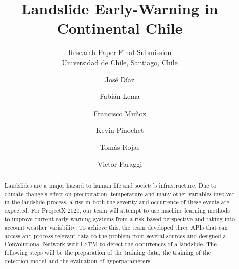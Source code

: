 \documentclass[sigconf, nonacm]{acmart}
\begin{document}
\title{Landslide Early-Warning in Continental Chile}
\subtitle{Research Paper Final Submission \\
Universidad de Chile, Santiago, Chile} 


\author{José Díaz}
\affiliation{}

\author{Fabián Lema}
\affiliation{}

\author{Francisco Muñoz}
\affiliation{}

\author{Kevin Pinochet}
\affiliation{}

\author{Tomás Rojas}
\affiliation{}

\author{Victor Faraggi}
\affiliation{}

\begin{abstract}

% 
Landslides are a major hazard to human life and society's infrastructure. Due to climate change's effect on precipitation, temperature and many other variables involved in the landslide process, a rise in both the severity and occurrence of these events are expected. For ProjectX 2020, our team will attempt to use machine learning methods to improve current early warning systems from a risk based perspective and taking into account weather variability. %
To achieve this, the team developed three APIs that can access and process relevant data to the problem from several sources and designed a Convolutional Network with LSTM to detect the occurrences of a landslide. The following steps will be the preparation of the training data, the training of the detection model and the evaluation of hyperparameters.

\end{abstract}
\end{document}
